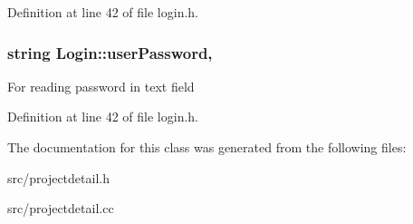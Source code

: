 Definition at line 42 of file login.\-h.

\hypertarget{classLogin_a9731be126468f535f161f045c95687c6}{
\subsubsection[{user\-Password}]{\setlength{\rightskip}{0pt plus 5cm}string Login\-::user\-Password\hspace{0.3cm}{\ttfamily [protected]}, {\ttfamily [inherited]}}}\label{classLogin_a9731be126468f535f161f045c95687c6}
For reading password in text field 

Definition at line 42 of file login.\-h.



The documentation for this class was generated from the following files\-:\begin{DoxyCompactItemize}
\item 
src/projectdetail.\-h\item 
src/projectdetail.\-cc\end{DoxyCompactItemize}
